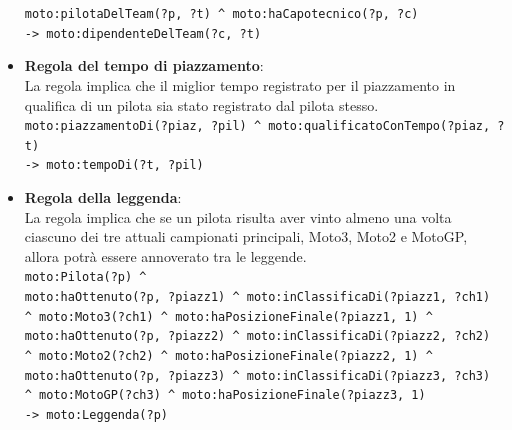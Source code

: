 \begin{itemize}
  \texttt{moto:pilotaDelTeam(?p, ?t) \textasciicircum\ moto:haCapotecnico(?p, ?c)\\-> moto:dipendenteDelTeam(?c, ?t)}

  \item \textbf{Regola del tempo di piazzamento}:\\
  
  La regola implica che il miglior tempo registrato per il piazzamento in qualifica di un pilota sia stato registrato dal pilota stesso.\\

  \texttt{moto:piazzamentoDi(?piaz, ?pil) \textasciicircum\ moto:qualificatoConTempo(?piaz, ?t)\\-> moto:tempoDi(?t, ?pil)}

  \item \textbf{Regola della leggenda}:\\
  
  La regola implica che se un pilota risulta aver vinto almeno una volta ciascuno dei tre attuali campionati principali, Moto3, Moto2 e MotoGP, allora potrà essere annoverato tra le leggende.\\

  \texttt{moto:Pilota(?p) \textasciicircum\\ moto:haOttenuto(?p, ?piazz1) \textasciicircum\ moto:inClassificaDi(?piazz1, ?ch1) \textasciicircum\ moto:Moto3(?ch1) \textasciicircum\ moto:haPosizioneFinale(?piazz1, 1) \textasciicircum\\ moto:haOttenuto(?p, ?piazz2) \textasciicircum\ moto:inClassificaDi(?piazz2, ?ch2) \textasciicircum\ moto:Moto2(?ch2) \textasciicircum\ moto:haPosizioneFinale(?piazz2, 1) \textasciicircum\\ moto:haOttenuto(?p, ?piazz3) \textasciicircum\ moto:inClassificaDi(?piazz3, ?ch3) \textasciicircum\ moto:MotoGP(?ch3) \textasciicircum\ moto:haPosizioneFinale(?piazz3, 1)\\-> moto:Leggenda(?p)}

\end{itemize}